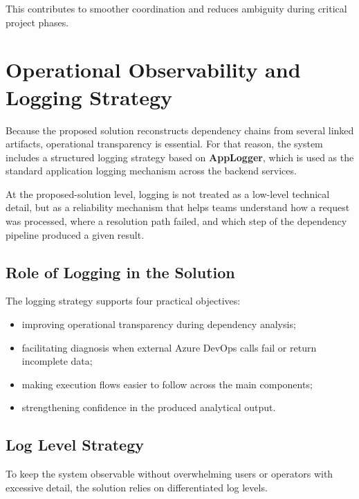 This contributes to smoother coordination and reduces ambiguity during critical
project phases.

\section{Operational Observability and Logging Strategy}

Because the proposed solution reconstructs dependency chains from several linked
artifacts, operational transparency is essential. For that reason, the system
includes a structured logging strategy based on \textbf{AppLogger}, which is used
as the standard application logging mechanism across the backend services.

At the proposed-solution level, logging is not treated as a low-level technical
detail, but as a reliability mechanism that helps teams understand how a request
was processed, where a resolution path failed, and which step of the dependency
pipeline produced a given result.

\subsection{Role of Logging in the Solution}

The logging strategy supports four practical objectives:

\begin{itemize}
  \item improving operational transparency during dependency analysis;
  \item facilitating diagnosis when external Azure DevOps calls fail or return incomplete data;
  \item making execution flows easier to follow across the main components;
  \item strengthening confidence in the produced analytical output.
\end{itemize}

\subsection{Log Level Strategy}

To keep the system observable without overwhelming users or operators with
excessive detail, the solution relies on differentiated log levels.

